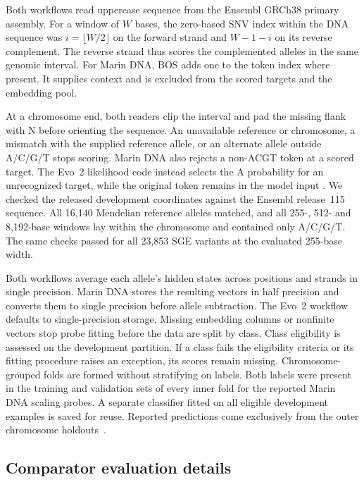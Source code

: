 \documentclass[a4paper,num-refs]{oup-contemporary}
\begin{document}
Both workflows read uppercase sequence from the Ensembl GRCh38 primary
assembly. For a window of $W$ bases, the zero-based SNV index within
the DNA sequence was $i=\lfloor W/2\rfloor$ on the forward strand and
$W-1-i$ on its reverse complement. The reverse strand thus scores the
complemented alleles in the same genomic interval. For Marin DNA, BOS
adds one to the token index where present. It supplies context and is
excluded from the scored targets and the embedding pool.

At a chromosome end, both readers clip the interval and pad the
missing flank with N before orienting the sequence. An unavailable
reference or chromosome, a mismatch with the supplied reference allele,
or an alternate allele outside A/C/G/T stops scoring. Marin DNA also
rejects a non-ACGT token at a scored target. The Evo~2 likelihood code
instead selects the A probability for an unrecognized target, while
the original token remains in the model input
\citep{marindnabencheval,marindnaevo2code}. We checked the released
development coordinates against the Ensembl release~115 sequence.
All 16,140 Mendelian reference alleles matched, and all 255-, 512- and
8,192-base windows lay within the chromosome and contained only A/C/G/T.
The same checks passed for all 23,853 SGE variants at the evaluated
255-base width.

Both workflows average each allele's hidden states across positions
and strands in single precision. Marin DNA stores the resulting vectors
in half precision and converts them to single precision before allele
subtraction. The Evo~2 workflow defaults to single-precision storage.
Missing embedding columns or nonfinite vectors stop probe fitting
before the data are split by class. Class eligibility is assessed on
the development partition. If a class fails the eligibility criteria
or its fitting procedure raises an exception, its scores remain
missing. Chromosome-grouped folds are formed without stratifying on
labels. Both labels were present in the training and validation sets
of every inner fold for the reported Marin DNA scaling probes.
A separate classifier fitted on all eligible development examples is
saved for reuse. Reported predictions come exclusively from the outer
chromosome holdouts~\citep{marindnabencheval,marindnaevo2code}.

\subsection{Comparator evaluation details}\label{supp:comparators}
\end{document}
